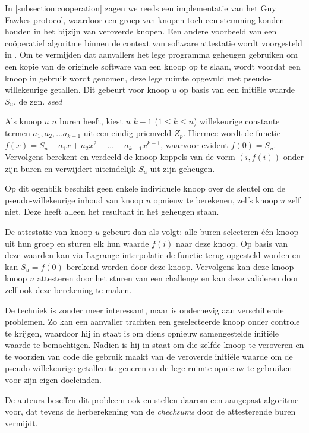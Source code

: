 In \ref{subsection:cooperation} zagen we reeds een implementatie van het Guy
Fawkes protocol, waardoor een groep van knopen toch een stemming konden houden
in het bijzijn van veroverde knopen. Een andere voorbeeld van een co\"operatief
algoritme binnen de context van software attestatie wordt voorgesteld in
\cite{yang2007distributed}. Om te vermijden dat aanvallers het lege programma
geheugen gebruiken om een kopie van de originele software van een knoop op te
slaan, wordt voordat een knoop in gebruik wordt genomen, deze lege ruimte
opgevuld met pseudo-willekeurige getallen. Dit gebeurt voor knoop $u$ op basis
van een initi\"ele waarde $S_u$, de zgn. \emph{seed}

Als knoop $u$ $n$ buren heeft, kiest $u$ $k - 1$ ($1 \leq k \leq n$)
willekeurige constante termen $a_1, a_2, \dots a_{k-1}$ uit een eindig
priemveld $Z_p$. Hiermee wordt de functie $f(x) = S_u + a_1 x+a_2 x^2 + \dots +
a_{k-1} x^{k-1}$, waarvoor evident $f(0) = S_u$. Vervolgens berekent en
verdeeld de knoop koppels van de vorm $(i,f(i))$ onder zijn buren en verwijdert
uiteindelijk $S_u$ uit zijn geheugen.

Op dit ogenblik beschikt geen enkele individuele knoop over de sleutel om de
pseudo-willekeurige inhoud van knoop $u$ opnieuw te berekenen, zelfs knoop $u$
zelf niet. Deze heeft alleen het resultaat in het geheugen staan.

De attestatie van knoop $u$ gebeurt dan als volgt: alle buren selecteren
\'e\'en knoop uit hun groep en sturen elk hun waarde $f(i)$ naar deze knoop. Op
basis van deze waarden kan via Lagrange interpolatie de functie terug opgesteld
worden en kan $S_u = f(0)$ berekend worden door deze knoop. Vervolgens kan deze
knoop knoop $u$ attesteren door het sturen van een challenge en kan deze
valideren door zelf ook deze berekening te maken.

De techniek is zonder meer interessant, maar is onderhevig aan verschillende
problemen. Zo kan een aanvaller trachten een geselecteerde knoop onder controle
te krijgen, waardoor hij in staat is om diens opnieuw samengestelde initi\"ele
waarde te bemachtigen. Nadien is hij in staat om die zelfde knoop te veroveren
en te voorzien van code die gebruik maakt van de veroverde initi\"ele waarde om
de pseudo-willekeurige getallen te generen en de lege ruimte opnieuw te
gebruiken voor zijn eigen doeleinden.

De auteurs beseffen dit probleem ook en stellen daarom een aangepast algoritme
voor, dat tevens de herberekening van de \emph{checksums} door de attesterende
buren vermijdt.

